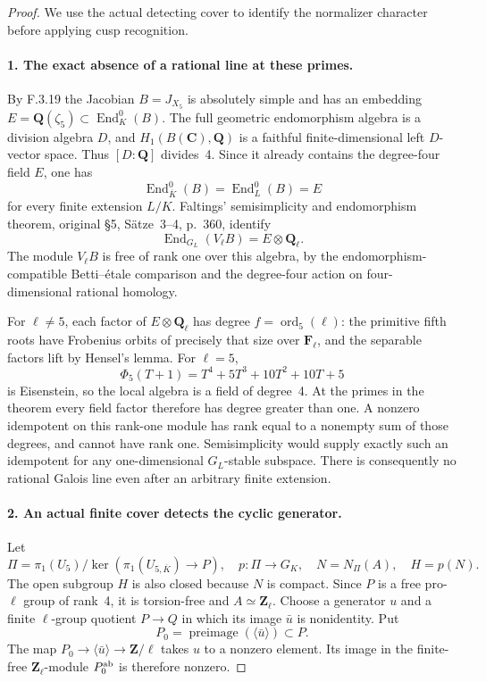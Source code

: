 \begin{proof}
We use the actual detecting cover to identify the normalizer character before applying cusp recognition.

\paragraph{1. The exact absence of a rational line at these primes.}

By F.3.19 the Jacobian $B=J_{X_5}$ is absolutely simple and has
an embedding $E=\mathbf Q(\zeta_5)\subset\operatorname{End}^0_K(B)$.
The full geometric endomorphism algebra is a division algebra
$D$, and $H_1(B(\mathbf C),\mathbf Q)$ is a faithful finite-dimensional
left $D$-vector space. Thus $[D:\mathbf Q]$ divides~4. Since it
already contains the degree-four field $E$, one has
\[
 \operatorname{End}^0_{\overline K}(B)
 =\operatorname{End}^0_L(B)=E
\]
for every finite extension $L/K$.
Faltings' semisimplicity and endomorphism theorem, original
\S5, S\"atze~3--4, p.~360, identify\cite{GenFaltings1983}
\[
 \operatorname{End}_{G_L}(V_\ell B)=E\otimes\mathbf Q_\ell.
\]
The module $V_\ell B$ is free of rank one over this algebra, by
the endomorphism-compatible Betti--\'etale comparison and the
degree-four action on four-dimensional rational homology.

For $\ell\ne5$, each factor of $E\otimes\mathbf Q_\ell$ has degree
$f=\operatorname{ord}_5(\ell)$: the primitive fifth roots have
Frobenius orbits of precisely that size over $\mathbf F_\ell$,
and the separable factors lift by Hensel's lemma. For $\ell=5$,
\[
 \Phi_5(T+1)=T^4+5T^3+10T^2+10T+5
\]
is Eisenstein, so the local algebra is a field of degree~4.
At the primes in the theorem every field factor therefore has
degree greater than one. A nonzero idempotent on this rank-one
module has rank equal to a nonempty sum of those degrees, and
cannot have rank one. Semisimplicity would supply exactly such
an idempotent for any one-dimensional $G_L$-stable subspace.
There is consequently no rational Galois line even after an
arbitrary finite extension.

\paragraph{2. An actual finite cover detects the cyclic generator.}
Let
\[
 \Pi=\pi_1(U_5)/\ker(\pi_1(U_{5,\overline K})\to P),
 \quad p:\Pi\to G_K,\quad N=N_\Pi(A),\quad H=p(N).
\]
The open subgroup $H$ is also closed because $N$ is compact.
Since $P$ is a free pro-$\ell$ group of rank~4, it is torsion-free
and $A\simeq\mathbf Z_\ell$. Choose a generator $u$ and a finite
$\ell$-group quotient $P\to Q$ in which its image $\bar u$ is
nonidentity. Put
\[
 P_0=\operatorname{preimage}(\langle\bar u\rangle)\subset P.
\]
The map $P_0\to\langle\bar u\rangle\to\mathbf Z/\ell$ takes
$u$ to a nonzero element. Its image in the finite-free
$\mathbf Z_\ell$-module $P_0^{\rm ab}$ is therefore nonzero.


\end{proof}

